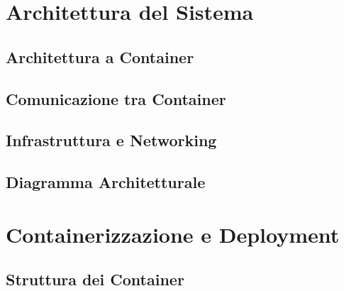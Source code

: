 \documentclass[12pt,a4paper]{report}
\begin{document}
\chapter{Architettura del Sistema}
\label{cap:architettura}

\section{Architettura a Container}

\section{Comunicazione tra Container}

\section{Infrastruttura e Networking}

\section{Diagramma Architetturale}

\chapter{Containerizzazione e Deployment}
\label{cap:docker}

\section{Struttura dei Container}
\end{document}
